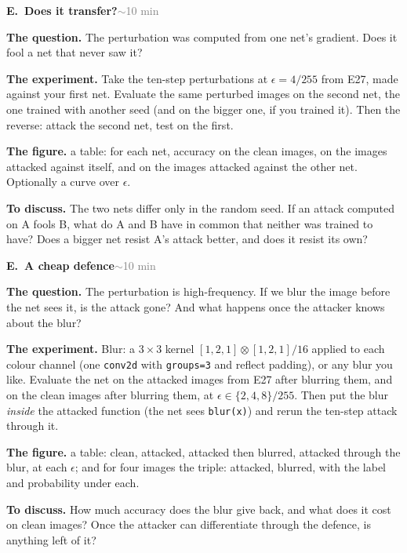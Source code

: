 \documentclass[11pt]{article}
\newcommand{\code}[1]{\texttt{#1}}
\newcounter{exp}
\newenvironment{experiment}[2]{\refstepcounter{exp}\par\medskip
  \textbf{\textcolor{aiblue}{E\theexp.\ #1}}\hfill{\small\textcolor{gray}{#2}}\par}{\par}
\newcommand{\qn}[1]{\textbf{The question.} #1\par}
\newcommand{\expt}[1]{\textbf{The experiment.} #1\par}
\newcommand{\fig}[1]{\textbf{The figure.} #1\par}
\newcommand{\disc}[1]{\textbf{To discuss.} #1\par}
\begin{document}
\begin{experiment}{Does it transfer?}{$\sim$10 min}
\qn{The perturbation was computed from one net's gradient. Does it fool a net that never saw it?}
\expt{Take the ten-step perturbations at $\epsilon=4/255$ from E27, made against your first net. Evaluate the same perturbed images on the second net, the one trained with another seed (and on the bigger one, if you trained it). Then the reverse: attack the second net, test on the first.}
\fig{a table: for each net, accuracy on the clean images, on the images attacked against itself, and on the images attacked against the other net. Optionally a curve over $\epsilon$.}
\disc{The two nets differ only in the random seed. If an attack computed on A fools B, what do A and B have in common that neither was trained to have? Does a bigger net resist A's attack better, and does it resist its own?}
\end{experiment}

\begin{experiment}{A cheap defence}{$\sim$10 min}
\qn{The perturbation is high-frequency. If we blur the image before the net sees it, is the attack gone? And what happens once the attacker knows about the blur?}
\expt{Blur: a $3\times3$ kernel $[1,2,1]\otimes[1,2,1]/16$ applied to each colour channel (one \code{conv2d} with \code{groups=3} and reflect padding), or any blur you like. Evaluate the net on the attacked images from E27 after blurring them, and on the clean images after blurring them, at $\epsilon\in\{2,4,8\}/255$. Then put the blur \emph{inside} the attacked function (the net sees \code{blur(x)}) and rerun the ten-step attack through it.}
\fig{a table: clean, attacked, attacked then blurred, attacked through the blur, at each $\epsilon$; and for four images the triple: attacked, blurred, with the label and probability under each.}
\disc{How much accuracy does the blur give back, and what does it cost on clean images? Once the attacker can differentiate through the defence, is anything left of it?}
\end{experiment}
\end{document}
